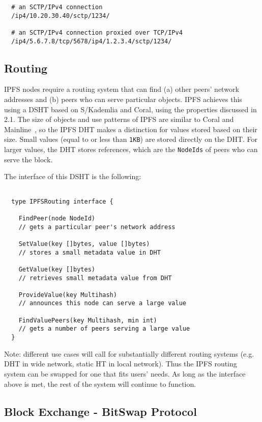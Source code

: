 \documentclass{sig-alternate}
\begin{document}
\begin{verbatim}
  # an SCTP/IPv4 connection
  /ip4/10.20.30.40/sctp/1234/

  # an SCTP/IPv4 connection proxied over TCP/IPv4
  /ip4/5.6.7.8/tcp/5678/ip4/1.2.3.4/sctp/1234/
\end{verbatim}

\subsection{Routing}

IPFS nodes require a routing system that can find (a) other peers' network addresses and (b) peers who can serve particular objects. IPFS achieves this using a DSHT based on S/Kademlia and Coral, using the properties discussed in 2.1. The size of objects and use patterns of IPFS are similar to Coral \cite{freedman04} and Mainline~\cite{wang13}, so the IPFS DHT makes a distinction for values stored based on their size. Small values (equal to or less than \texttt{1KB}) are stored directly on the DHT. For larger values, the DHT stores references, which are the \texttt{NodeIds} of peers who can serve the block.

The interface of this DSHT is the following:

\begin{verbatim}

  type IPFSRouting interface {

    FindPeer(node NodeId)
    // gets a particular peer's network address

    SetValue(key []bytes, value []bytes)
    // stores a small metadata value in DHT

    GetValue(key []bytes)
    // retrieves small metadata value from DHT

    ProvideValue(key Multihash)
    // announces this node can serve a large value

    FindValuePeers(key Multihash, min int)
    // gets a number of peers serving a large value
  }
\end{verbatim}

Note: different use cases will call for substantially different routing systems (e.g. DHT in wide network, static HT in local network). Thus the IPFS routing system can be swapped for one that fits users' needs. As long as the interface above is met, the rest of the system will continue to function.

\subsection{Block Exchange - BitSwap Protocol}
\end{document}
